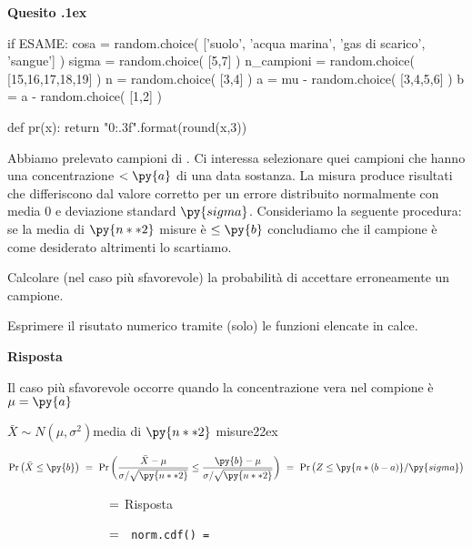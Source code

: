 \documentclass[11pt,twoside,a4paper]{article}
\def\Pr{{\rm Pr\,}}
\newcounter{quesito}
\newenvironment{question}{\addtocounter{quesito}{1}\bigskip\bigskip\par\textbf{Quesito \thequesito.\kern1ex}}{\vspace{\parskip}}
\newenvironment{answer}{\par\textbf{Risposta\quad}}{\vspace{\parskip}}
\begin{document}
\begin{question} %
\begin{pycode}
if ESAME:
    cosa = random.choice( ['suolo', 'acqua marina', 'gas di scarico', 'sangue'] )
    sigma = random.choice( [5,7] )
    n_campioni = random.choice( [15,16,17,18,19] )
    n = random.choice( [3,4] )
    a = mu - random.choice( [3,4,5,6] )
    b = a - random.choice( [1,2] )

def pr(x):
    return "{0:.3f}".format(round(x,3))
\end{pycode}
Abbiamo prelevato  campioni di . Ci interessa selezionare quei campioni che hanno una concentrazione $<\py{a}$ di una data sostanza. La misura produce risultati che differiscono dal valore corretto per un errore distribuito normalmente con media $0$ e deviazione standard $\py{sigma}$. Consideriamo la seguente procedura: se la media di $\py{n**2}$ misure è $\le\py{b}$ concludiamo che il campione è come desiderato altrimenti lo scartiamo.

Calcolare (nel caso più sfavorevole) la probabilità di accettare erroneamente un campione.

Esprimere il risutato numerico tramite (solo) le funzioni elencate in calce.
\begin{answer}

Il caso più sfavorevole occorre quando la concentrazione vera nel compione è $\mu=\py{a}$ 


$\bar X\sim N(\mu,\sigma^2)$\hfill media di $\py{n**2}$ misure\kern22ex

$\displaystyle\Pr\big(\bar X\le\py{b}\big)\ =\ \Pr\bigg(\frac{\bar X-\mu}{\sigma/\sqrt{\py{n**2}}}\le\frac{\py{b}-\mu}{\sigma/\sqrt{\py{n**2}}}\bigg)\ =\  \Pr\big(Z\le\py{n * (b-a) } /\py{sigma} \big)$

$\phantom{\Pr\big(\bar X\le\py{b}\big)}\ =\ ${\hfill Risposta}

$\phantom{\Pr\big(\bar X\le\py{b}\big)}\ =\ ${\tt\ norm.cdf()\ =\  }
\end{answer}
\end{question}
\end{document}
